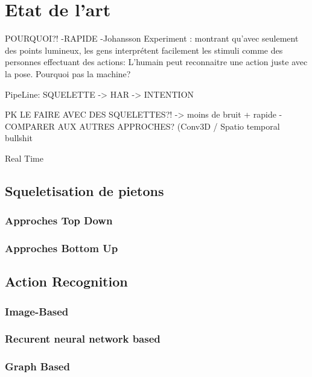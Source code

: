 \section{Etat de l'art}
\label{sec:SOTA}

POURQUOI?!
-RAPIDE
-Johansson Experiment \cite{johansson1973visual,johansson1976spatio}: montrant qu'avec seulement des points lumineux, les gens interprétent facilement les stimuli comme des personnes effectuant des actions: L'humain peut reconnaitre une action juste avec la pose. Pourquoi pas la machine?

PipeLine: SQUELETTE -> HAR -> INTENTION

PK LE FAIRE AVEC DES SQUELETTES?! -> moins de bruit + rapide
-COMPARER AUX AUTRES APPROCHES? (Conv3D / Spatio temporal bullshit

Real Time

\subsection{Squeletisation de pietons}

\label{subsec:SQUEL}
\subsubsection{Approches Top Down}
\subsubsection{Approches Bottom Up}

\subsection{Action Recognition}
\label{subsec:HAR}

\subsubsection{Image-Based}
\subsubsection{Recurent neural network based}
\subsubsection{Graph Based}

